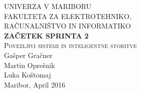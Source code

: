 \documentclass[a4paper,11pt]{article}
\begin{document}
\begin{titlepage}


\newcommand{\HRule}{\rule{\linewidth}{0.5mm}} %

\center %
 

\textsc{ UNIVERZA V MARIBORU\\ FAKULTETA ZA ELEKTROTEHNIKO,\\RAČUNALNIŠTVO IN INFORMATIKO}\\[5cm] %

{ \huge \bfseries \textbf{ZAČETEK SPRINTA 2}}\\[0.4cm] %
\textsc{\large Povezljivi sistemi in inteligentne storitve}\\[5cm] %

{\large Gašper Gračner}\\[0.4cm]
{\large Martin Oprešnik}\\[0.4cm]
{\large Luka Koštomaj}\\[0.4cm] 

\vfill %
{\large Maribor, April 2016}\\[3cm] %
\end{titlepage}
\newpage

\end{document}
